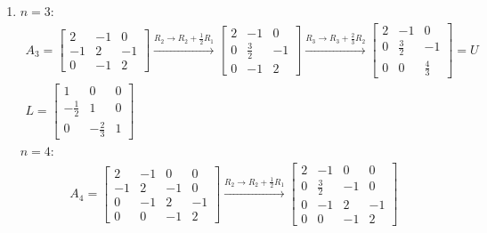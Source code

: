 \documentclass[a4paper,12pt]{article}
\begin{document}
\begin{enumerate}
    \item
        $n = 3$:
        \begin{gather*}
            A_3 =
            \left[ \begin{array}{ccc}
                2 &-1 &0 \\
                -1 &2 &-1 \\
                0 &-1 &2
            \end{array} \right]
            \xrightarrow{R_2 \rightarrow R_2 + \frac{1}{2}R_1}
            \left[ \begin{array}{ccc}
                2 &-1 &0 \\
                0 &\frac{3}{2} &-1 \\
                0 &-1 &2
            \end{array} \right]
            \xrightarrow{R_3 \rightarrow R_3 + \frac{2}{3}R_2}
            \left[ \begin{array}{ccc}
                2 &-1 &0 \\
                0 &\frac{3}{2} &-1 \\
                0 &0 &\frac{4}{3}
            \end{array} \right]
            = U \\
            L = \left[ \begin{array}{ccc}
                    1 & 0 & 0 \\
                    -\frac{1}{2} & 1 & 0 \\
                    0 & -\frac{2}{3} & 1
            \end{array} \right]
        \end{gather*}
        $n = 4$:
        \begin{gather*}
            A_4 =
            \left[ \begin{array}{cccc}
                2 &-1 &0 &0 \\
                -1 &2 &-1 &0 \\
                0 &-1 &2 &-1 \\
                0 &0 &-1 &2
            \end{array} \right]
            \xrightarrow{R_2 \rightarrow R_2 + \frac{1}{2}R_1}
            \left[ \begin{array}{cccc}
                2 &-1 &0 &0 \\
                0 &\frac{3}{2} &-1 &0 \\
                0 &-1 &2 &-1 \\
                0 &0 &-1 &2
            \end{array} \right] \\

\end{gather*}
\end{enumerate}
\end{document}
